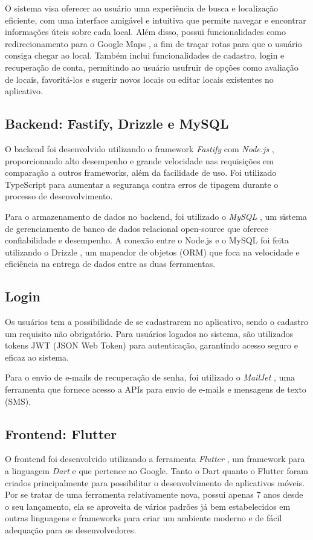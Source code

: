 O sistema visa oferecer ao usuário uma experiência de busca e localização eficiente, com uma interface amigável e intuitiva que permite navegar e encontrar informações úteis sobre cada local. Além disso, possui funcionalidades como redirecionamento para o Google Maps \cite{maps2005}, a fim de traçar rotas para que o usuário consiga chegar ao local. Também inclui funcionalidades de cadastro, login e recuperação de conta, permitindo ao usuário usufruir de opções como avaliação de locais, favoritá-los e sugerir novos locais ou editar locais existentes no aplicativo.


\subsection{Backend: Fastify, Drizzle e MySQL}
O backend foi desenvolvido utilizando o framework \textit{Fastify} \cite{fastify} com \textit{Node.js} \cite{nodejs}, proporcionando alto desempenho e grande velocidade nas requisições em comparação a outros frameworks, além da facilidade de uso. Foi utilizado TypeScript \cite{typescript} para aumentar a segurança contra erros de tipagem durante o processo de desenvolvimento.

Para o armazenamento de dados no backend, foi utilizado o \textit{MySQL} \cite{mysql}, um sistema de gerenciamento de banco de dados relacional open-source que oferece confiabilidade e desempenho. A conexão entre o Node.js e o MySQL foi feita utilizando o Drizzle \cite{drizzle}, um mapeador de objetos (ORM) que foca na velocidade e eficiência na entrega de dados entre as duas ferramentas.

\subsection{Login}
Os usuários tem a possibilidade de se cadastrarem no aplicativo, sendo o cadastro um requisito não obrigatório. Para usuários logados no sistema, são utilizados tokens JWT (JSON Web Token) \cite{jwt} para autenticação, garantindo acesso seguro e eficaz ao sistema.

Para o envio de e-mails de recuperação de senha, foi utilizado o \textit{MailJet} \cite{mailjet}, uma ferramenta que fornece acesso a APIs para envio de e-mails e mensagens de texto (SMS).

\subsection{Frontend: Flutter}
O frontend foi desenvolvido utilizando a ferramenta \textit{Flutter} \cite{flutter}, um framework para a linguagem \textit{Dart} \cite{dart} e que pertence ao Google. Tanto o Dart quanto o Flutter foram criados principalmente para possibilitar o desenvolvimento de aplicativos móveis. Por se tratar de uma ferramenta relativamente nova, possui apenas 7 anos desde o seu lançamento, ela se aproveita de vários padrões já bem estabelecidos em outras linguagens e frameworks para criar um ambiente moderno e de fácil adequação para os desenvolvedores.

